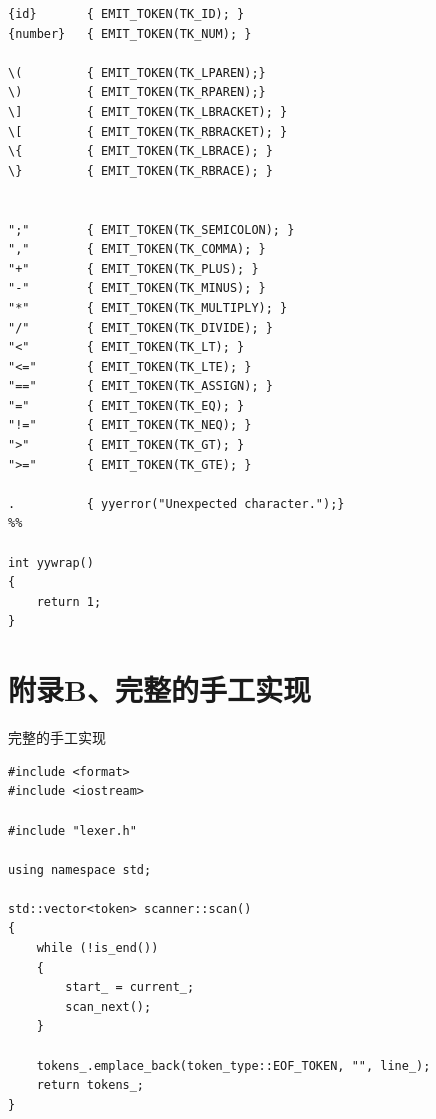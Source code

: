 \documentclass[a4paper,twoside]{article}
\newenvironment{longlisting}{\captionsetup{type=figure}}{}
\begin{document}
\begin{spacing}{1.2}
\begin{longlisting}
\begin{verbatim}
{id}       { EMIT_TOKEN(TK_ID); }
{number}   { EMIT_TOKEN(TK_NUM); }

\(         { EMIT_TOKEN(TK_LPAREN);}
\)         { EMIT_TOKEN(TK_RPAREN);}
\]         { EMIT_TOKEN(TK_LBRACKET); }
\[         { EMIT_TOKEN(TK_RBRACKET); }
\{         { EMIT_TOKEN(TK_LBRACE); }
\}         { EMIT_TOKEN(TK_RBRACE); }


";"        { EMIT_TOKEN(TK_SEMICOLON); }
","        { EMIT_TOKEN(TK_COMMA); }
"+"        { EMIT_TOKEN(TK_PLUS); }
"-"        { EMIT_TOKEN(TK_MINUS); }
"*"        { EMIT_TOKEN(TK_MULTIPLY); }
"/"        { EMIT_TOKEN(TK_DIVIDE); }
"<"        { EMIT_TOKEN(TK_LT); }
"<="       { EMIT_TOKEN(TK_LTE); }
"=="       { EMIT_TOKEN(TK_ASSIGN); }
"="        { EMIT_TOKEN(TK_EQ); }
"!="       { EMIT_TOKEN(TK_NEQ); }
">"        { EMIT_TOKEN(TK_GT); }
">="       { EMIT_TOKEN(TK_GTE); }

.          { yyerror("Unexpected character.");}
%%

int yywrap()
{
    return 1;
}
	\end{verbatim}
\end{longlisting}

\clearpage

\section{附录B、完整的手工实现}

\begin{longlisting}
	\caption{完整的手工实现}
	\label{code:fullcode}
	\begin{verbatim}
#include <format>
#include <iostream>

#include "lexer.h"

using namespace std;

std::vector<token> scanner::scan()
{
	while (!is_end())
	{
		start_ = current_;
		scan_next();
	}

	tokens_.emplace_back(token_type::EOF_TOKEN, "", line_);
	return tokens_;
}


\end{verbatim}
\end{longlisting}
\end{spacing}
\end{document}
